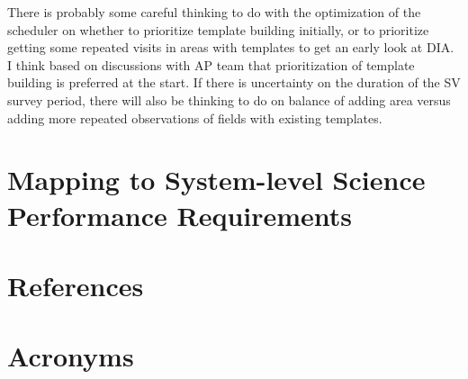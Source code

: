 \documentclass[SE,authoryear,toc,lsstdraft]{lsstdoc}
\begin{document}
There is probably some careful thinking to do with the optimization of the scheduler on whether to prioritize template building initially, or to prioritize getting some repeated visits in areas with templates to get an early look at DIA. I think based on discussions with AP team that prioritization of template building is preferred at the start. If there is uncertainty on the duration of the SV survey period, there will also be thinking to do on balance of adding area versus adding more repeated observations of fields with existing templates.





\section{Mapping to System-level Science Performance Requirements}

\appendix
\section{References} \label{sec:bib}
\renewcommand{\refname}{} %


\section{Acronyms} \label{sec:acronyms}

\end{document}
